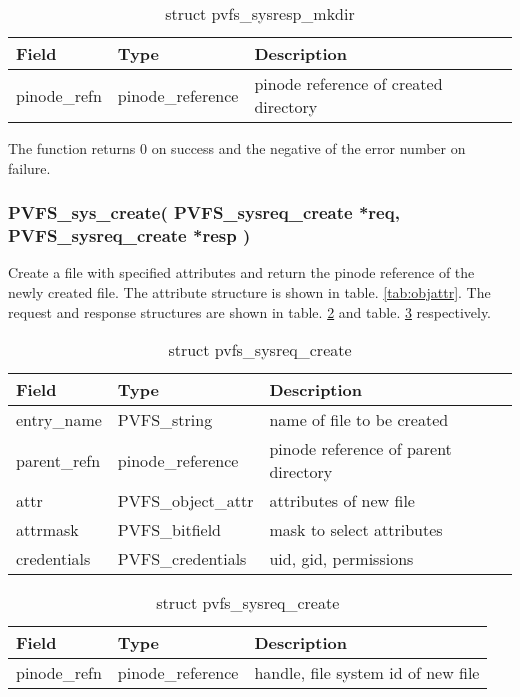 \documentclass[11pt, letterpaper]{article}
\begin{document}
\begin{table}[H]
\begin{tabular}{|l|l|l|}
\hline
Field & Type & Description \\
\hline
\hline
pinode\_refn & pinode\_reference & pinode reference of created directory
\\
\hline
\end{tabular}
\caption{struct pvfs\_sysresp\_mkdir}\label{tab:respmkdir}
\end{table}

The function returns 0 on success and the negative of the error number
on failure.

\subsubsection{PVFS\_sys\_create(
PVFS\_sysreq\_create *req,
PVFS\_sysreq\_create *resp
)}
		
Create a file with specified attributes and return the pinode
reference of the newly created file. The attribute structure is
shown in table. \ref{tab:objattr}. The request and response structures
are shown in table. \ref{tab:reqcreate} and table. \ref{tab:respcreate}
respectively.

\begin{table}[H]
\begin{tabular}{|l|l|l|}
\hline
Field & Type & Description \\
\hline
\hline
entry\_name & PVFS\_string & name of file to be created \\
\hline
parent\_refn & pinode\_reference & pinode reference of parent directory
\\
\hline
attr & PVFS\_object\_attr & attributes of new file \\
\hline
attrmask & PVFS\_bitfield & mask to select attributes \\
\hline
credentials & PVFS\_credentials & uid, gid, permissions \\
\hline
\end{tabular}
\caption{struct pvfs\_sysreq\_create}\label{tab:reqcreate}
\end{table}

\begin{table}[H]
\begin{tabular}{|l|l|l|}
\hline
Field & Type & Description \\
\hline
\hline
pinode\_refn & pinode\_reference & handle, file system id of new file \\
\hline
\end{tabular}
\caption{struct pvfs\_sysreq\_create}\label{tab:respcreate}
\end{table}
\end{document}
